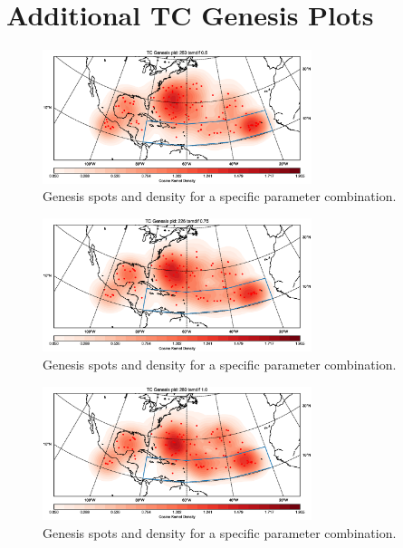



\chapter{Additional TC Genesis Plots}\label{sec:genesis-appendix}

\begin{figure}[ht]
	\centering
	\includegraphics[width=0.7\textwidth]{img/genesis_plot_temdif05.eps}
	\caption{Genesis spots and density for a specific parameter combination.}
\end{figure}
\begin{figure}[ht]
	\centering
	\includegraphics[width=0.7\textwidth]{img/genesis_plot_temdif075.eps}
	\caption{Genesis spots and density for a specific parameter combination.}
\end{figure}
\begin{figure}[ht]
	\centering
	\includegraphics[width=0.7\textwidth]{img/genesis_plot_temdif1.eps}
	\caption{Genesis spots and density for a specific parameter combination.}
\end{figure}
